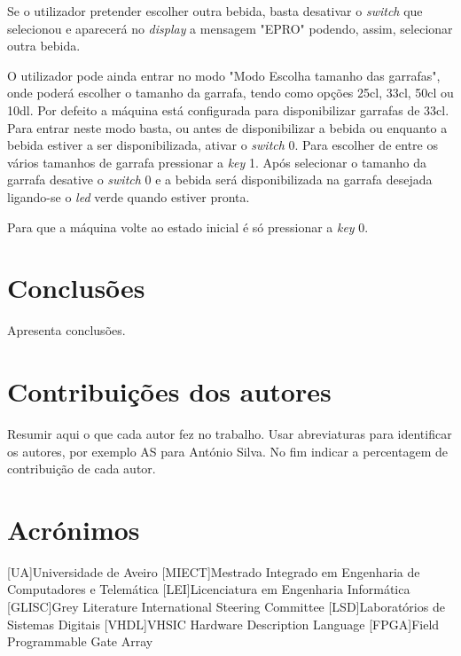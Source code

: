 \documentclass{report}
\begin{document}
Se o utilizador pretender escolher outra bebida, basta desativar o \textit{switch} que selecionou e aparecerá no \textit{display} a mensagem "EPRO" podendo, assim, selecionar outra bebida.

O utilizador pode ainda entrar no modo "Modo Escolha tamanho das garrafas", onde poderá escolher o tamanho da garrafa, tendo como opções 25cl, 33cl, 50cl ou 10dl. Por defeito a máquina está configurada para disponibilizar garrafas de 33cl. Para entrar neste modo basta, ou antes de disponibilizar a bebida ou enquanto a bebida estiver a ser disponibilizada, ativar o \textit{switch} 0. Para escolher de entre os vários tamanhos de garrafa pressionar a \textit{key} 1. Após selecionar o tamanho da garrafa desative o \textit{switch} 0 e a bebida será disponibilizada na garrafa desejada ligando-se o \textit{led} verde quando estiver pronta. 

Para que a máquina volte ao estado inicial é só pressionar a \textit{key} 0.

 



\chapter{Conclusões}
\label{chap.conclusao}
Apresenta conclusões.

\chapter*{Contribuições dos autores}
Resumir aqui o que cada autor fez no trabalho.
Usar abreviaturas para identificar os autores,
por exemplo AS para António Silva.
No fim indicar a percentagem de contribuição de cada autor.

\chapter*{Acrónimos}
\begin{acronym}
[UA]{Universidade de Aveiro}
[MIECT]{Mestrado Integrado em Engenharia de Computadores e Telemática}
[LEI]{Licenciatura em Engenharia Informática}
[GLISC]{Grey Literature International Steering Committee}
[LSD]{Laboratórios de Sistemas Digitais}
[VHDL]{VHSIC Hardware Description Language}
[FPGA]{Field Programmable Gate Array}
\end{acronym}


\printbibliography
\end{document}
